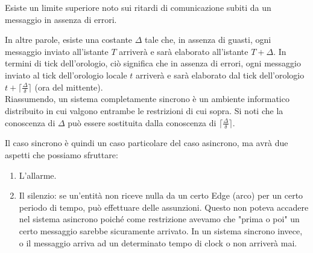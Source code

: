\begin{limit}
    Esiste un limite
    superiore noto sui ritardi di comunicazione subiti da un messaggio in assenza di
    errori.
\end{limit}

In altre parole, esiste una costante $\Delta$ tale che, in assenza di guasti,
ogni messaggio inviato all'istante $T$ arriverà e sarà elaborato all'istante $T
    + \Delta$. In termini di tick dell'orologio, ciò significa che in assenza di
errori, ogni messaggio inviato al tick dell'orologio locale $t$ arriverà e sarà
elaborato dal tick dell'orologio $t + \lceil \frac{\Delta}{\delta} \rceil$ (ora
del mittente).\\

Riassumendo, un sistema completamente sincrono è un ambiente informatico
distribuito in cui valgono entrambe le restrizioni di cui sopra. Si noti che la
conoscenza di $\Delta$ può essere sostituita dalla conoscenza di $\lceil
    \frac{\Delta}{\delta} \rceil$.

Il caso sincrono è quindi un caso particolare del caso asincrono, ma avrà due
aspetti che possiamo sfruttare:
\begin{enumerate}
    \item L'allarme.
    \item Il silenzio: se un'entità non riceve nulla da un certo Edge (arco) per
          un certo periodo di tempo, può effettuare delle assunzioni. Questo non poteva
          accadere nel sistema asincrono poiché come restrizione avevamo che "prima o
          poi" un certo messaggio sarebbe sicuramente arrivato.  In un sistema sincrono
          invece, o il messaggio arriva ad un determinato tempo di clock o non arriverà
          mai.
\end{enumerate}

